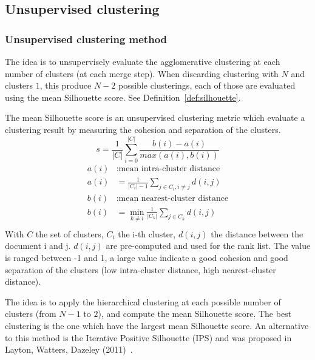 \subsection{Unsupervised clustering \label{sec:unsupervised_clustering}}

\subsubsection{Unsupervised clustering method}

The idea is to unsupervisely evaluate the agglomerative clustering at each number of clusters (at each merge step).
When discarding clustering with $N$ and clusters $1$, this produce $N - 2$ possible clusterings, each of those are evaluated using the mean Silhouette score.
See Definition~\ref{def:silhouette}.

\begin{definition}
  \label{def:silhouette}
  The mean Silhouette score is an unsupervised clustering metric which evaluate a clustering result by measuring the cohesion and separation of the clusters.
  \begin{equation}
    s = \frac{1}{|C|} \sum_{i = 0}^{|C|} \frac{b(i) - a(i)}{max(a(i), b(i))}
  \end{equation}
  \begin{equation*}
    \begin{split}
      a(i)&: \text{mean intra-cluster distance} \\
      a(i)& = \frac{1}{|C_i| - 1} \sum_{j \in C_i, i\neq j} d(i, j) \\
      b(i)&: \text{mean nearest-cluster distance} \\
      b(i)& = \min_{k\neq i} \frac{1}{|C_k|} \sum_{j \in C_k} d(i, j) \\
    \end{split}
  \end{equation*}
  With $C$ the set of clusters, $C_i$ the i-th cluster, $d(i, j)$ the distance between the document i and j.
  $d(i, j)$ are pre-computed and used for the rank list.
  The value is ranged between -1 and 1, a large value indicate a good cohesion and good separation of the clusters (low intra-cluster distance, high nearest-cluster distance).
\end{definition}

The idea is to apply the hierarchical clustering at each possible number of clusters (from $N - 1$ to $2$), and compute the mean Silhouette score.
The best clustering is the one which have the largest mean Silhouette score.
An alternative to this method is the Iterative Positive Silhouette (IPS) and was proposed in Layton, Watters, Dazeley (2011)~\cite{automated_unsupervised}.

